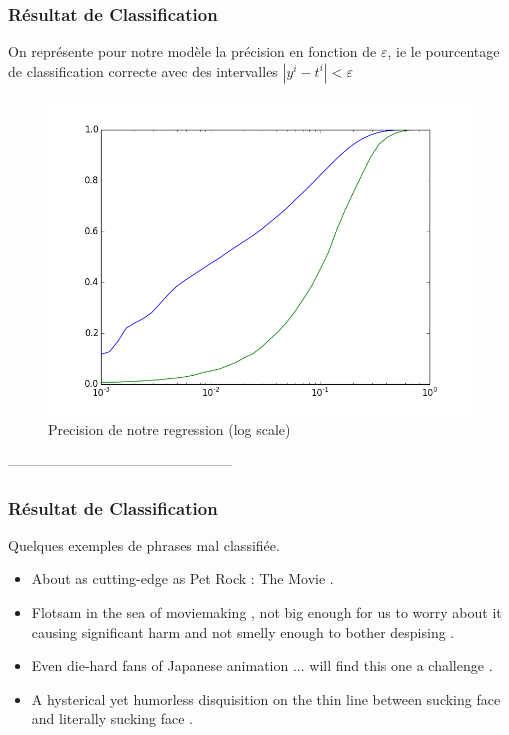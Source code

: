 \documentclass{beamer}
\begin{document}
\begin{frame}
\frametitle{Résultat de Classification}
On représente pour notre modèle la précision en fonction de $\varepsilon$, ie le pourcentage de classification correcte avec des intervalles $|y^i-t^i|<\varepsilon$
\begin{figure}[htp]
\centering
\includegraphics[scale=0.4]{fig/log_eps_curve.png}
\caption{Precision de notre regression (log scale)}
\end{figure}

\end{frame}


------------------------------------------------

\begin{frame}
\frametitle{Résultat de Classification}
Quelques exemples de phrases mal classifiée.
\begin{itemize}\setlength{\itemsep}{5mm}
\item About as cutting-edge as Pet Rock : The Movie .
\item Flotsam in the sea of moviemaking , not big enough for us to worry about it causing significant harm and not smelly enough to bother despising .
\item Even die-hard fans of Japanese animation ... will find this one a challenge .
\item A hysterical yet humorless disquisition on the thin line between sucking face and literally sucking face .
\end{itemize}

\end{frame}
\end{document}
